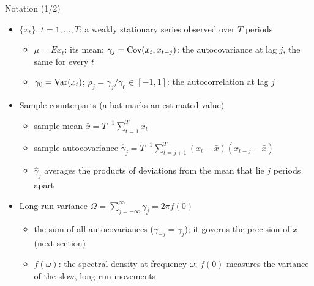 \begin{frame}{Notation (1/2)}
\itemsize{\small}
\begin{itemize}
    \item $\{x_t\}$, $t = 1, \dots, T$: a weakly stationary series observed over $T$ periods
    \begin{itemize}
        \item $\mu = E x_t$: its mean; $\gamma_j = \text{Cov}(x_t, x_{t-j})$: the autocovariance at lag $j$, the same for every $t$
        \item $\gamma_0 = \text{Var}(x_t)$; $\rho_j = \gamma_j/\gamma_0 \in [-1, 1]$: the autocorrelation at lag $j$
    \end{itemize}
    \item Sample counterparts (a hat marks an estimated value)
    \begin{itemize}
        \item sample mean $\bar{x} = T^{-1}\sum_{t=1}^{T} x_t$
        \item sample autocovariance $\hat\gamma_j = T^{-1}\sum_{t=j+1}^{T}(x_t - \bar x)(x_{t-j} - \bar x)$
        \item $\hat\gamma_j$ averages the products of deviations from the mean that lie $j$ periods apart
    \end{itemize}
    \item Long-run variance $\Omega = \sum_{j=-\infty}^{\infty}\gamma_j = 2\pi f(0)$
    \begin{itemize}
        \item the sum of all autocovariances ($\gamma_{-j} = \gamma_j$); it governs the precision of $\bar x$ (next section)
        \item $f(\omega)$: the spectral density at frequency $\omega$; $f(0)$ measures the variance of the slow, long-run movements
    \end{itemize}
\end{itemize}
\end{frame}

